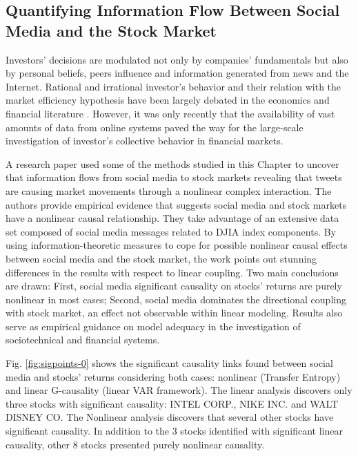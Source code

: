 \documentclass[]{book}
\theoremstyle{definition}
\theoremstyle{definition}
\theoremstyle{definition}
\theoremstyle{remark}
\begin{document}
\subsection{Quantifying Information Flow Between Social Media and the
Stock
Market}\label{quantifying-information-flow-between-social-media-and-the-stock-market}

Investors' decisions are modulated not only by companies' fundamentals
but also by personal beliefs, peers influence and information generated
from news and the Internet. Rational and irrational investor's behavior
and their relation with the market efficiency hypothesis
\citep{JOFI:JOFI518} have been largely debated in the economics and
financial literature \citep{shleifer2000inefficient}. However, it was
only recently that the availability of vast amounts of data from online
systems paved the way for the large-scale investigation of investor's
collective behavior in financial markets.

A research paper \citep{2016arXiv160104535S} used some of the methods
studied in this Chapter to uncover that information flows from social
media to stock markets revealing that tweets are causing market
movements through a nonlinear complex interaction. The authors provide
empirical evidence that suggests social media and stock markets have a
nonlinear causal relationship. They take advantage of an extensive data
set composed of social media messages related to DJIA index components.
By using information-theoretic measures to cope for possible nonlinear
causal effects between social media and the stock market, the work
points out stunning differences in the results with respect to linear
coupling. Two main conclusions are drawn: First, social media
significant causality on stocks' returns are purely nonlinear in most
cases; Second, social media dominates the directional coupling with
stock market, an effect not observable within linear modeling. Results
also serve as empirical guidance on model adequacy in the investigation
of sociotechnical and financial systems.

Fig. \ref{fig:sigpoints-0} shows the significant causality links found
between social media and stocks' returns considering both cases:
nonlinear (Transfer Entropy) and linear G-causality (linear VAR
framework). The linear analysis discovers only three stocks with
significant causality: INTEL CORP., NIKE INC. and WALT DISNEY CO. The
Nonlinear analysis discovers that several other stocks have significant
causality. In addition to the 3 stocks identified with significant
linear causality, other 8 stocks presented purely nonlinear causality.
\end{document}
